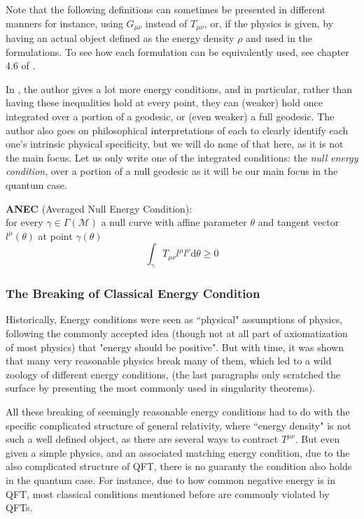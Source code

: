 \documentclass[a4paper,11pt]{article}
\numberwithin{equation}{section}
\theoremstyle{definition}
\renewcommand{\d}{{\mathrm{d}}}
\begin{document}
Note that the following definitions can sometimes be presented in different manners for instance, using $G_{\mu\nu}$ instead of $T_{\mu\nu}$, or, if the physics is given, by having an actual object defined as the energy density $\rho$ and used in the formulations. To see how each formulation can be equivalently used, see chapter 4.6 of \cite{E_Cond}.

In \cite{Primer}, the author gives a lot more energy conditions, and in particular, rather than having these inequalities hold at every point, they can (weaker) hold once integrated over a portion of a geodesic, or (even weaker) a full geodesic. The author also goes on philosophical interpretations of each to clearly identify each one's intrinsic physical specificity, but we will do none of that here, as it is not the main focus. Let us only write one of the integrated conditions: the \emph{null energy condition}, over a portion of a null geodesic as it will be our main focus in the quantum case.

\textbf{ANEC} (Averaged Null Energy Condition):\\
for every $\gamma\in\Gamma(\mathcal{M})$ a null curve with affine parameter $\theta$ and tangent vector $l^\mu(\theta)$ at point $\gamma(\theta)$
\begin{equation}
    \int_\gamma T_{\mu\nu}l^\mu l^\nu\d\theta \geq 0
\end{equation}
\subsubsection{The Breaking of Classical Energy Condition}
Historically, Energy conditions were seen as ``physical" assumptions of physics, following the commonly accepted idea (though not at all part of axiomatization of most physics) that "energy should be positive". But with time, it was shown that many very reasonable physics break many of them, which led to a wild zoology of different energy conditions, (the last paragraphs only scratched the surface by presenting the most commonly used in singularity theorems).

All these breaking of seemingly reasonable energy conditions had to do with the specific complicated structure of general relativity, where ``energy density" is not such a well defined object, as there are several ways to contract $T^{\mu\nu}$. But even given a simple physics, and an associated matching energy condition, due to the also complicated structure of QFT, there is no guaranty the condition also holds in the quantum case. For instance, due to how common negative energy is in QFT, most classical conditions mentioned before are commonly violated by QFTs.
\end{document}

